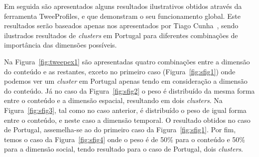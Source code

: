 Em seguida são apresentados alguns resultados ilustrativos obtidos através da ferramenta TweeProfiles, e que demonstram o seu funcionamento global. Este resultados serão baseados apenas nos apresentados por Tiago Cunha~\cite{Cunha2013}, sendo ilustrados resultados de \textit{clusters} em Portugal para diferentes combinações de importância das dimensões possíveis. 


Na Figura~\ref{fig:tweepex1} são apresentadas quatro combinações entre a dimensão do conteúdo e as restantes, exceto no primeiro caso (Figura~\ref{fig:sfig1}) onde podemos ver um \textit{cluster} em Portugal apenas tendo em consideração a dimensão do conteúdo. Já no caso da Figura~\ref{fig:sfig2} o peso é distribuído da mesma forma entre o conteúdo e a dimensão espacial, resultando em dois \textit{clusters}. Na Figura~\ref{fig:sfig3}, tal como no caso anterior, é distribuído o peso de igual forma entre o conteúdo, e neste caso a dimensão temporal. O resultado obtidos no caso de Portugal, assemelha-se ao do primeiro caso da Figura~\ref{fig:sfig1}. Por fim, temos o caso da Figura~\ref{fig:sfig4} onde o peso é de 50\% para o conteúdo e 50\% para a dimensão social, tendo resultado para o caso de Portugal, dois \textit{clusters}. 

